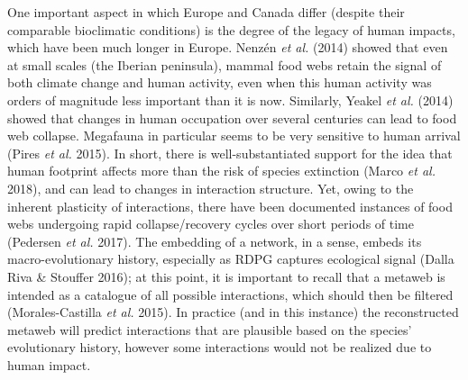 \documentclass[11pt]{article}
\begin{document}
One important aspect in which Europe and Canada differ (despite their
comparable bioclimatic conditions) is the degree of the legacy of human
impacts, which have been much longer in Europe. Nenzén \emph{et al.}
(2014) showed that even at small scales (the Iberian peninsula), mammal
food webs retain the signal of both climate change and human activity,
even when this human activity was orders of magnitude less important
than it is now. Similarly, Yeakel \emph{et al.} (2014) showed that
changes in human occupation over several centuries can lead to food web
collapse. Megafauna in particular seems to be very sensitive to human
arrival (Pires \emph{et al.} 2015). In short, there is
well-substantiated support for the idea that human footprint affects
more than the risk of species extinction (Marco \emph{et al.} 2018), and
can lead to changes in interaction structure. Yet, owing to the inherent
plasticity of interactions, there have been documented instances of food
webs undergoing rapid collapse/recovery cycles over short periods of
time (Pedersen \emph{et al.} 2017). The embedding of a network, in a
sense, embeds its macro-evolutionary history, especially as RDPG
captures ecological signal (Dalla Riva \& Stouffer 2016); at this point,
it is important to recall that a metaweb is intended as a catalogue of
all possible interactions, which should then be filtered
(Morales-Castilla \emph{et al.} 2015). In practice (and in this
instance) the reconstructed metaweb will predict interactions that are
plausible based on the species' evolutionary history, however some
interactions would not be realized due to human impact.
\end{document}
